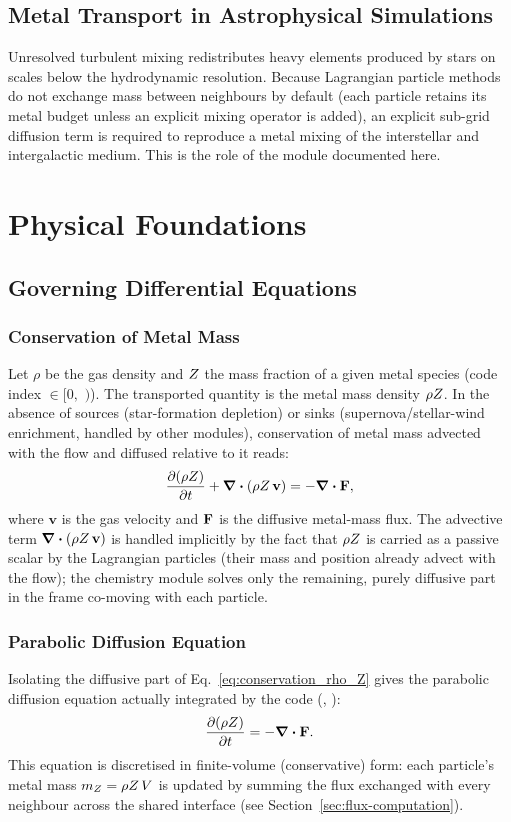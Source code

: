 \subsection{Metal Transport in Astrophysical Simulations}
Unresolved turbulent mixing redistributes heavy elements produced by
stars on scales below the hydrodynamic resolution. Because Lagrangian
particle methods do not exchange mass between neighbours by default
(each particle retains its metal budget unless an explicit mixing
operator is added), an explicit sub-grid diffusion term is required to
reproduce a metal mixing of the interstellar and intergalactic medium.
This is the role of the module documented here.

\section{Physical Foundations}
\label{sec:physical-foundations}

\subsection{Governing Differential Equations}

\subsubsection{Conservation of Metal Mass}
Let $\rho$ be the gas density and $Z$ the mass fraction of a given
metal species (code index  $\in [0,$
$)$). The transported quantity is the
metal mass density $\rho Z$. In the absence of sources (star-formation
depletion) or sinks (supernova/stellar-wind enrichment, handled by other
modules), conservation of metal mass advected with the flow and diffused
relative to it reads:
\begin{equation}
  \label{eq:conservation_rho_Z}
  \pdv{(\rho Z)}{t} + \div (\rho Z\, \mathbf{v}) = -\div \mathbf{F} ,
\end{equation}
where $\mathbf{v}$ is the gas velocity and $\mathbf{F}$ is the diffusive
metal-mass flux. The advective term $\div(\rho Z\,\mathbf v)$ is handled
implicitly by the fact that $\rho Z$ is carried as a passive scalar by the
Lagrangian particles (their mass and position already advect with the
flow); the chemistry module solves only the remaining, purely diffusive
part in the frame co-moving with each particle.

\subsubsection{Parabolic Diffusion Equation}
Isolating the diffusive part of Eq.~\eqref{eq:conservation_rho_Z} gives
the parabolic diffusion equation actually integrated by the code
(, ):
\begin{equation}
  \label{eq:parabolic_diffusion_rho_Z}
  \pdv{(\rho Z)}{t} = -\div \mathbf{F} .
\end{equation}
This equation is discretised in finite-volume (conservative) form: each
particle's metal mass $m_Z = \rho Z\, V$ is updated by summing the flux
exchanged with every neighbour across the shared interface (see
Section~\ref{sec:flux-computation}).

